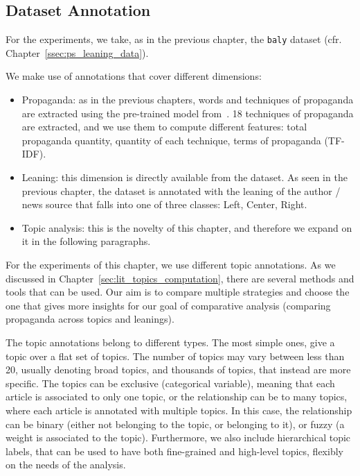 \subsection{\statusgreen Dataset Annotation}
\label{sec:topic_method_data}

For the experiments, we take, as in the previous chapter, the \texttt{baly} dataset (cfr. Chapter~\ref{ssec:ps_leaning_data}).

We make use of annotations that cover different dimensions:
\begin{itemize}
    \item Propaganda: as in the previous chapters, words and techniques of propaganda are extracted using the pre-trained model from~\cite{da2019fine}. 18 techniques of propaganda are extracted, and we use them to compute different features: total propaganda quantity, quantity of each technique, terms of propaganda (TF-IDF).
    \item Leaning: this dimension is directly available from the dataset. As seen in the previous chapter, the dataset is annotated with the leaning of the author / news source that falls into one of three classes: Left, Center, Right.
    \item Topic analysis: this is the novelty of this chapter, and therefore we expand on it in the following paragraphs. %
\end{itemize}



For the experiments of this chapter, we use different topic annotations. As we discussed in Chapter~\ref{sec:lit_topics_computation}, there are several methods and tools that can be used.
Our aim is to compare multiple strategies and choose the one that gives more insights for our goal of comparative analysis (comparing propaganda across topics and leanings).

The topic annotations belong to different types. The most simple ones, give a topic over a flat set of topics. The number of topics may vary between less than 20, usually denoting broad topics, and thousands of topics, that instead are more specific.
The topics can be exclusive (categorical variable), meaning that each article is associated to only one topic, or the relationship can be to many topics, where each article is annotated with multiple topics. In this case, the relationship can be binary (either not belonging to the topic, or belonging to it), or fuzzy (a weight is associated to the topic).
Furthermore, we also include hierarchical topic labels, that can be used to have both fine-grained and high-level topics, flexibly on the needs of the analysis.

